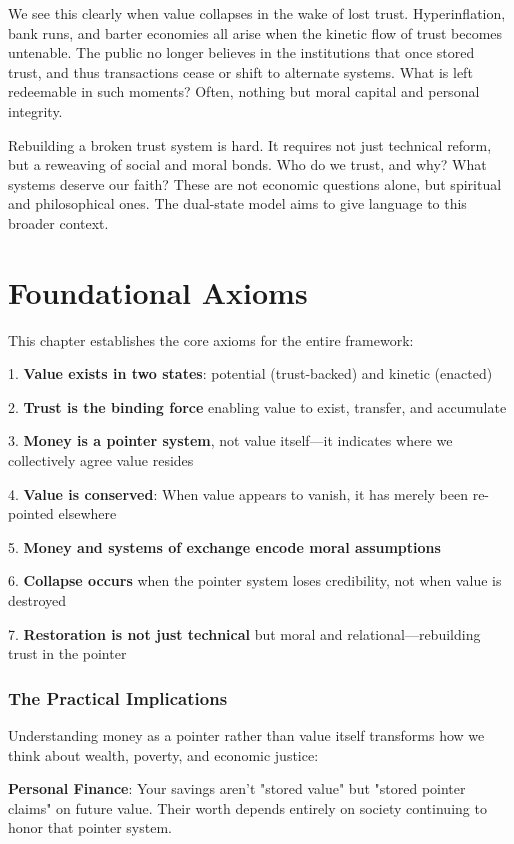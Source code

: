 \documentclass[11pt,oneside]{book}
\begin{document}
We see this clearly when value collapses in the wake of lost trust. Hyperinflation, bank runs, and barter economies all arise when the kinetic flow of trust becomes untenable. The public no longer believes in the institutions that once stored trust, and thus transactions cease or shift to alternate systems. What is left redeemable in such moments? Often, nothing but moral capital and personal integrity.

Rebuilding a broken trust system is hard. It requires not just technical reform, but a reweaving of social and moral bonds. Who do we trust, and why? What systems deserve our faith? These are not economic questions alone, but spiritual and philosophical ones. The dual-state model aims to give language to this broader context.

\section{Foundational Axioms}

This chapter establishes the core axioms for the entire framework:


1. \textbf{Value exists in two states}: potential (trust-backed) and kinetic (enacted)


2. \textbf{Trust is the binding force} enabling value to exist, transfer, and accumulate


3. \textbf{Money is a pointer system}, not value itself—it indicates where we collectively agree value resides


4. \textbf{Value is conserved}: When value appears to vanish, it has merely been re-pointed elsewhere


5. \textbf{Money and systems of exchange encode moral assumptions}


6. \textbf{Collapse occurs} when the pointer system loses credibility, not when value is destroyed


7. \textbf{Restoration is not just technical} but moral and relational—rebuilding trust in the pointer


\subsubsection{The Practical Implications}

Understanding money as a pointer rather than value itself transforms how we think about wealth, poverty, and economic justice:

\textbf{Personal Finance}: Your savings aren't "stored value" but "stored pointer claims" on future value. Their worth depends entirely on society continuing to honor that pointer system.
\end{document}

